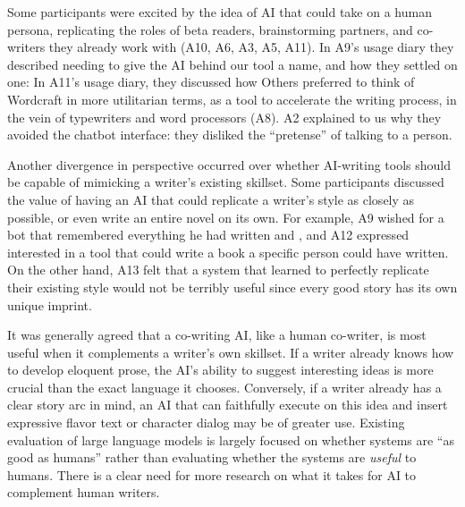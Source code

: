 Some participants were excited by the idea of AI that could take on a human persona, replicating the roles of beta readers, brainstorming partners, and co-writers they already work with (A10, A6, A3, A5, A11).
In A9's usage diary they described needing to give the AI behind our tool a name, and how they settled on one: 
In A11's usage diary, they discussed how 
Others preferred to think of Wordcraft in more utilitarian terms, as a tool to accelerate the writing process, in the vein of typewriters and word processors (A8).
A2 explained to us why they avoided the chatbot interface: they disliked the ``pretense'' of talking to a person.

Another divergence in perspective occurred over whether AI-writing tools should be capable of mimicking a writer's existing skillset.
Some participants discussed the value of having an AI that could replicate a writer's style as closely as possible, or even write an entire novel on its own.
For example, A9 wished for a bot that remembered everything he had written and , and A12 expressed interested in a tool that could write a book a specific person could have written.
On the other hand, A13 felt that a system that learned to perfectly replicate their existing style would not be terribly useful since every good story has its own unique imprint.

It was generally agreed that a co-writing AI, like a human co-writer, is most useful when it complements a writer's own skillset.
If a writer already knows how to develop eloquent prose, the AI's ability to suggest interesting ideas is more crucial than the exact language it chooses.
Conversely, if a writer already has a clear story arc in mind, an AI that can faithfully execute on this idea and insert expressive flavor text or character dialog may be of greater use.
Existing evaluation of large language models is largely focused on whether systems are ``as good as humans'' \citep{srivastava2022beyond} rather than evaluating whether the systems are \textit{useful} to humans.
There is a clear need for more research on what it takes for AI to complement human writers.

